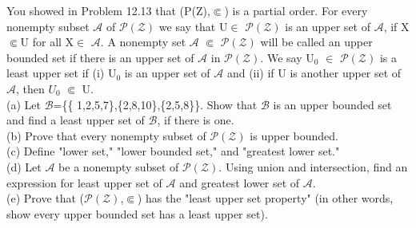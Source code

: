 \documentclass[11pt, a4paper, UTF8]{ctexart}
\begin{document}
\begin{problem}[UD:12.16]
You showed in Problem 12.13 that (P(Z),$\Subset$) is a partial order. For every nonempty subset $\mathcal{A}$ of $\mathcal{P(Z)}$ we say that U$\in$ $\mathcal{P(Z)}$ is an upper set of $\mathcal{A}$, if X$\Subset$U for all X$\in$ $\mathcal{A}$. A nonempty set $\mathcal{A}$ $\Subset$ $\mathcal{P(Z)}$ will be called an upper bounded set if there is an upper set of $\mathcal{A}$ in $\mathcal{P(Z)}$. We say U$_0$ $\in$ $\mathcal{P(Z)}$ is a least upper set if (i) U$_0$ is an upper set of $\mathcal{A}$ and (ii) if U is another upper set of $\mathcal{A}$, then $U_0$ $\Subset$ U.\\
(a) Let $\mathcal{B}$=\{\{ 1,2,5,7\},\{2,8,10\},\{2,5,8\}\}. Show that $\mathcal{B}$ is an upper bounded set and find a least upper set of $\mathcal{B}$, if there is one.\\
(b) Prove that every nonempty subset of $\mathcal{P(Z)}$ is upper bounded.\\
(c) Define "lower set," "lower bounded set," and "greatest lower set."\\
(d) Let $\mathcal{A}$ be a nonempty subset of $\mathcal{P(Z)}$. Using union and intersection, find an expression for least upper set of $\mathcal{A}$ and greatest lower set of $\mathcal{A}$.\\
(e) Prove that ($\mathcal{P(Z)}$,$\Subset$) has the "least upper set property" (in other words, show every upper bounded set has a least upper set).
\end{problem}
\end{document}
